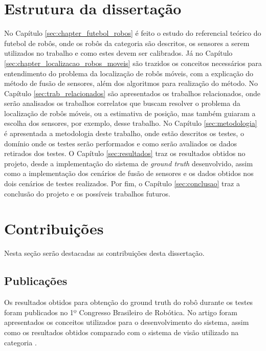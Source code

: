 \documentclass[acronym, symbols, table]{fei}
\begin{document}
	\section{Estrutura da dissertação}
	
		No Capítulo \ref{sec:chapter_futebol_robos} é feito o estudo do referencial teórico do futebol de robôs, onde os robôs da categoria  são descritos, os sensores a serem utilizados no trabalho e como estes devem ser calibrados. Já no Capítulo \ref{sec:chapter_localizacao_robos_moveis} são trazidos os conceitos necessários para entendimento do problema da localização de robôs móveis, com a explicação do método de fusão de sensores, além dos algoritmos para realização do método. No Capítulo \ref{sec:trab_relacionados} são apresentados os trabalhos relacionados, onde serão analisados os trabalhos correlatos que buscam resolver o problema da localização de robôs móveis, ou a estimativa de posição, mas também guiaram a escolha dos sensores, por exemplo, desse trabalho. No Capítulo \ref{sec:metodologia} é apresentada a metodologia deste trabalho, onde estão descritos os testes, o domínio onde os testes serão performados e como serão avaliados os dados retirados dos testes. O Capítulo \ref{sec:resultados} traz os resultados obtidos no projeto, desde a implementação do sistema de \textit{ground truth} desenvolvido, assim como a implementação dos cenários de fusão de sensores e os dados obtidos nos dois cenários de testes realizados. Por fim, o Capítulo \ref{sec:conclusao} traz a conclusão do projeto e os possíveis trabalhos futuros. %
		
	\section{Contribuições}
	
		Nesta seção serão destacadas as contribuições desta dissertação.
		
		\subsection{Publicações}
		
			Os resultados obtidos para obtenção do ground truth do robô durante os testes foram publicados no 1º Congresso Brasileiro de Robótica. No artigo foram apresentados os conceitos utilizados para o desenvolvimento do sistema, assim como os resultados obtidos comparado com o sistema de visão utilizado na categoria .
			
\end{document}
